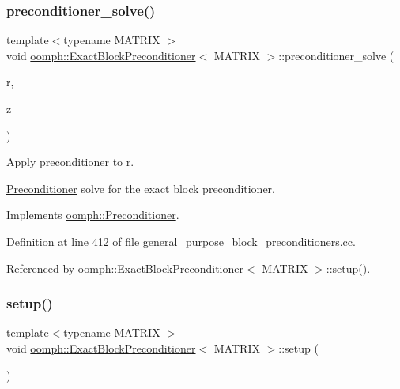 \subsubsection{\texorpdfstring{preconditioner\+\_\+solve()}{preconditioner\_solve()}}
{\footnotesize\ttfamily template$<$typename M\+A\+T\+R\+IX $>$ \\
void \hyperlink{classoomph_1_1ExactBlockPreconditioner}{oomph\+::\+Exact\+Block\+Preconditioner}$<$ M\+A\+T\+R\+IX $>$\+::preconditioner\+\_\+solve (\begin{DoxyParamCaption}\item[{const \hyperlink{classoomph_1_1DoubleVector}{Double\+Vector} \&}]{r,  }\item[{\hyperlink{classoomph_1_1DoubleVector}{Double\+Vector} \&}]{z }\end{DoxyParamCaption})\hspace{0.3cm}{\ttfamily [virtual]}}



Apply preconditioner to r. 

\hyperlink{classoomph_1_1Preconditioner}{Preconditioner} solve for the exact block preconditioner. 

Implements \hyperlink{classoomph_1_1Preconditioner_ace1199369e4465cd2b9a34884bb64ec8}{oomph\+::\+Preconditioner}.



Definition at line 412 of file general\+\_\+purpose\+\_\+block\+\_\+preconditioners.\+cc.



Referenced by oomph\+::\+Exact\+Block\+Preconditioner$<$ M\+A\+T\+R\+I\+X $>$\+::setup().

\mbox{\label{classoomph_1_1ExactBlockPreconditioner_a9961dff2ee506c32c52a04d1c0bd631d}} 
\subsubsection{\texorpdfstring{setup()}{setup()}}
{\footnotesize\ttfamily template$<$typename M\+A\+T\+R\+IX $>$ \\
void \hyperlink{classoomph_1_1ExactBlockPreconditioner}{oomph\+::\+Exact\+Block\+Preconditioner}$<$ M\+A\+T\+R\+IX $>$\+::setup (\begin{DoxyParamCaption}{ }\end{DoxyParamCaption})\hspace{0.3cm}{\ttfamily [virtual]}}



